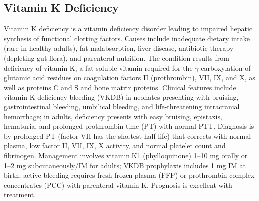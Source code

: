 \subsection{Vitamin K Deficiency}
\label{sec:Vitamin K Deficiency}
Vitamin K deficiency is a vitamin deficiency disorder leading to impaired hepatic synthesis of functional clotting factors. Causes include inadequate dietary intake (rare in healthy adults), fat malabsorption, liver disease, antibiotic therapy (depleting gut flora), and parenteral nutrition. The condition results from deficiency of vitamin K, a fat-soluble vitamin required for the $\gamma$-carboxylation of glutamic acid residues on coagulation factors II (prothrombin), VII, IX, and X, as well as proteins C and S and bone matrix proteins. Clinical features include vitamin K deficiency bleeding (VKDB) in neonates presenting with bruising, gastrointestinal bleeding, umbilical bleeding, and life-threatening intracranial hemorrhage; in adults, deficiency presents with easy bruising, epistaxis, hematuria, and prolonged prothrombin time (PT) with normal PTT. Diagnosis is by prolonged PT (factor VII has the shortest half-life) that corrects with normal plasma, low factor II, VII, IX, X activity, and normal platelet count and fibrinogen. Management involves vitamin K1 (phylloquinone) 1--10 mg orally or 1--2 mg subcutaneously/IM for adults; VKDB prophylaxis includes 1 mg IM at birth; active bleeding requires fresh frozen plasma (FFP) or prothrombin complex concentrates (PCC) with parenteral vitamin K. Prognosis is excellent with treatment.

